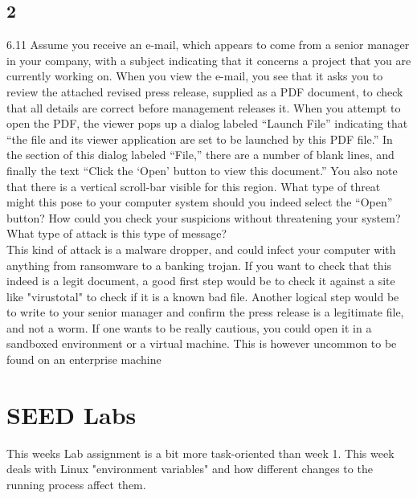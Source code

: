 \documentclass{article}
\begin{document}
\subsection{2}
6.11 Assume you receive an e-mail, which appears to come from a senior manager in your 
company, with a subject indicating that it concerns a project that you are currently 
working on. When you view the e-mail, you see that it asks you to review the attached 
revised press release, supplied as a PDF document, to check that all details are correct 
before management releases it. When you attempt to open the PDF, the viewer pops up a 
dialog labeled “Launch File” indicating that “the file and its viewer application are set 
to be launched by this PDF file.” In the section of this dialog labeled “File,” there are 
a number of blank lines, and finally the text “Click the ‘Open’ button to view this 
document.” You also note that there is a vertical scroll-bar visible for this region. What
type of threat might this pose to your computer system should you indeed select the 
“Open” button? How could you check your suspicions without threatening your system? What 
type of attack is this type of message?\\

This kind of attack is a malware dropper, and could infect your computer with
anything from ransomware to a banking trojan. If you want to check that this indeed is
a legit document, a good first step would be to check it against a site like "virustotal"
to check if it is a known bad file. Another logical step would be to write to your
senior manager and confirm the press release is a legitimate file, and not a worm. If
one wants to be really cautious, you could open it in a sandboxed environment or a
virtual machine. This is however uncommon to be found on an enterprise machine


\newpage
\section{SEED Labs}
This weeks Lab assignment is a bit more task-oriented than week 1. This week deals
with Linux "environment variables" and how different changes to the running
process affect them.\\
\end{document}
